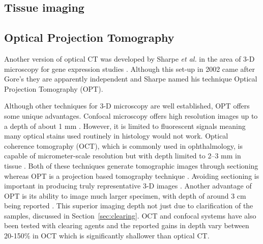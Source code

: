 	
	
	
	
	
	
	
	
	
	
	
	\subsection{Tissue imaging}
	\label{sec:tissue}
	\subsection*{Optical Projection Tomography}
	\label{subsec:OPT}
	Another version of optical CT was  developed by Sharpe \textit{et al.} in the area of 3-D microscopy for gene expression studies \cite{Sharpe:2002jp}. Although this set-up in 2002 came after Gore's they are apparently independent and Sharpe named his technique Optical Projection Tomography (OPT).
	
	Although other techniques for 3-D microscopy are well established, OPT offers some unique advantages. 
	Confocal microscopy offers high resolution images up to a depth of about 1 mm \cite{Webb:1996}. However, it is limited to fluorescent signals meaning many optical stains used routinely in histology would not work. Optical coherence tomography (OCT), which is commonly used in ophthalmology, is capable of micrometer-scale resolution but with  depth limited to 2--3 mm in tissue \cite{huang1993optical}. Both of these techniques generate tomographic images through sectioning whereas OPT is a projection based tomography technique \cite{Sharpe:2003cm}. Avoiding sectioning is important in producing truly representative 3-D images \cite{Oldham:2007ku}. Another advantage of  OPT is its ability to  image much larger specimen, with depth of around 3 cm being reported \cite{Oldham:2007ku}. This superior imaging depth not just due to clarification of the samples, discussed in Section~\ref{sec:clearing}. OCT and confocal systems have also been tested with clearing agents and the reported gains in depth vary between 20-150\% in OCT \cite{Tuchin:2002} which is significantly shallower than optical CT.
	
